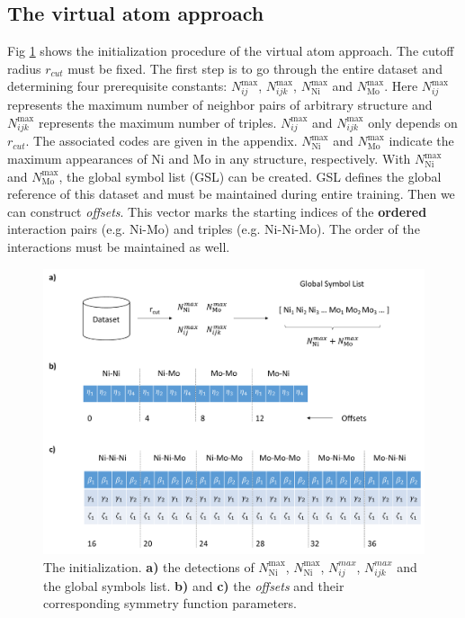 \documentclass[prb,preprint]{revtex4-2}
\begin{document}
\subsection{The virtual atom approach}
\label{section:virtual_atom_approach}

Fig \ref{fig:algo1} shows the initialization procedure of the virtual atom 
approach. The cutoff radius $r_{cut}$ must be fixed. The first step is to go 
through the entire dataset and determining four prerequisite constants: 
$N_{ij}^{\mathrm{max}}$, $N_{ijk}^{\mathrm{max}}$, 
$N_{\mathrm{Ni}}^{\mathrm{max}}$ and $N_{\mathrm{Mo}}^{\mathrm{max}}$. 
Here $N_{ij}^{\mathrm{max}}$ represents the maximum number of neighbor pairs of 
arbitrary structure and $N_{ijk}^{\mathrm{max}}$ represents the maximum number 
of triples. $N_{ij}^{\mathrm{max}}$ and $N_{ijk}^{\mathrm{max}}$ only depends on 
$r_{cut}$. The associated codes are given in the appendix.
$N_{\mathrm{Ni}}^{\mathrm{max}}$ and $N_{\mathrm{Mo}}^{\mathrm{max}}$ indicate 
the maximum appearances of Ni and Mo in any structure, respectively. 
With $N_{\mathrm{Ni}}^{\mathrm{max}}$ and $N_{\mathrm{Mo}}^{\mathrm{max}}$, 
the global symbol list (GSL) can be created. GSL defines the global reference 
of this dataset and must be maintained during entire training. Then we can 
construct \textit{offsets}. This vector marks the starting indices of the 
\textbf{ordered} interaction pairs (e.g. Ni-Mo) and triples (e.g. Ni-Ni-Mo). 
The order of the interactions must be maintained as well.

\begin{figure}[h!]
\centering
\includegraphics[scale=0.5]{figures/Fig1-prepare.pdf}
\caption{\label{fig:algo1} The initialization. 
\textbf{a)} the detections of $N_{\mathrm{Ni}}^{\mathrm{max}}$, 
$N_{\mathrm{Ni}}^{\mathrm{max}}$, $N_{ij}^{max}$, $N_{ijk}^{max}$ and the global
symbols list.
\textbf{b)} and \textbf{c)} the \textit{offsets} and their corresponding 
symmetry function parameters.
}
\end{figure}
\end{document}
